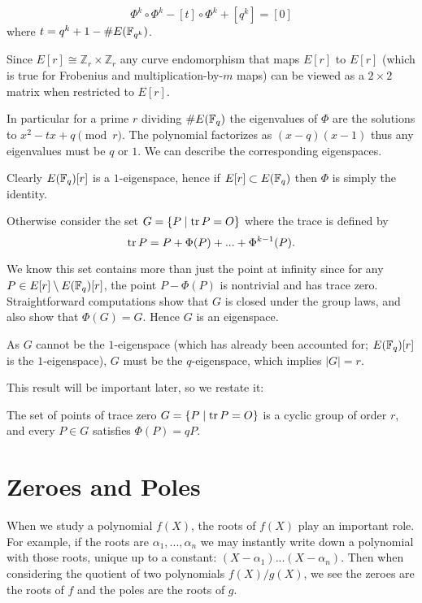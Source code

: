 \begin{theorem}
[Hasse]
\[ \Phi^k \circ \Phi^k - [t] \circ \Phi^k + [q^k] = [0] \]
where $t = q^k + 1 - \#E(\mathbb{F}_{q^k})$.
\end{theorem}

Since $E[r] \cong \mathbb{Z}_r \times \mathbb{Z}_r$ any curve endomorphism
that maps $E[r]$ to $E[r]$ (which is true for Frobenius and
multiplication-by-$m$ maps)
can be viewed as a $2\times 2$ matrix when restricted to $E[r]$.

In particular for a prime $r$ dividing $\#E(\mathbb{F}_q)$ the eigenvalues
of $\Phi$ are the solutions to $x^2 - t x + q \pmod{r}$.
The polynomial factorizes as $(x - q)(x - 1)$ thus any eigenvalues
must be $q$ or $1$. We can describe the corresponding eigenspaces.

Clearly $E(\mathbb{F}_q)[r]$ is a $1$-eigenspace, hence if $E[r] \subset E(\mathbb{F}_q)$
then $\Phi$ is simply the identity.

Otherwise consider the set $G = \{P \mid \mathop{\rm tr} P = O \}$
where the trace is defined by
\[ \mathop{\rm tr} P = P + \Phi(P) + ... + \Phi^{k-1}(P)  .\]

We know this set contains more than just the point at infinity
since for any $P \in E[r] \setminus E(\mathbb{F}_q)[r]$,
the point $P - \Phi(P)$ is nontrivial and has trace zero.
Straightforward computations show that $G$ is closed under the group laws,
and also show that $\Phi(G) = G$. Hence $G$ is an eigenspace.

As $G$ cannot be the $1$-eigenspace (which has already been accounted for;
$E(\mathbb{F}_q)[r]$ is the $1$-eigenspace), $G$ must be the $q$-eigenspace,
which implies $|G| = r$.

This result will be important later, so we restate it:

\begin{theorem}
The set of points of trace zero
$G = \{P \mid \mathop{\rm tr} P = O \}$ is a cyclic group of order $r$,
and every $P \in G$ satisfies $\Phi(P) = q P$.
\end{theorem}

\section {Zeroes and Poles}

When we study a polynomial $f(X)$, the roots of $f(X)$ play an important
role. For example, if the roots are $\alpha_1,...,\alpha_n$ we may
instantly write down a polynomial with those roots, unique up to a constant:
$(X-\alpha_1)...(X-\alpha_n)$. Then when considering the quotient of
two polynomials $f(X)/g(X)$, we see the zeroes are the roots of $f$ and
the poles are the roots of $g$.

